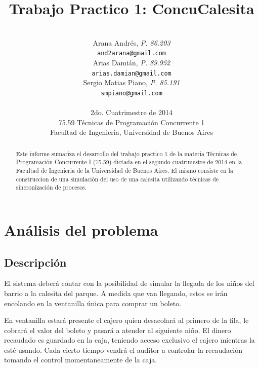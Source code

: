 \documentclass[a4paper,10pt]{article}
\title{\textbf{Trabajo Practico 1: ConcuCalesita}}
\author{\\
  Arana Andrés, \textit{P. 86.203}                                 \\
  \texttt{and2arana@gmail.com}                                     \\ [2.5ex]
  Arias Damián, \textit{P. 89.952}                                 \\
  \texttt{arias.damian@gmail.com}                                  \\ [2.5ex]
  Sergio Matias Piano, \textit{P. 85.191}                          \\
  \texttt{smpiano@gmail.com}                                       \\ [2.5ex]
                                                                   \\
  \normalsize{2do. Cuatrimestre de 2014}                           \\
  \normalsize{75.59 Técnicas de Programación Concurrente 1}        \\
  \normalsize{Facultad de Ingenieria, Universidad de Buenos Aires} \\
}
\date{}
\begin{document}
\thispagestyle{empty}
\maketitle

\begin{abstract}

  Este informe sumariza el desarrollo del trabajo practico 1 de la materia Técnicas de Programación Concurrente I (75.59) dictada en el segundo cuatrimestre de 2014 en la Facultad de Ingenieria de la Universidad de Buenos Aires. El mismo consiste en la construccion de una simulación del uso de una calesita utilizando técnicas de sincronización de procesos.

\end{abstract}

\clearpage

\tableofcontents
\clearpage




\section{Análisis del problema}

\subsection{Descripción}

El sistema deberá contar con la posibilidad de simular la llegada de los niños del barrio a la calesita del parque. A medida que van llegando, estos se irán encolando en la ventanilla única para comprar un boleto.

En ventanilla estará presente el cajero quien desacolará al primero de la fila, le cobrará el valor del boleto y pasará a atender al siguiente niño.
El dinero recaudado es guardado en la caja, teniendo acceso exclusivo el cajero mientras la esté usando.
Cada cierto tiempo vendrá el auditor a controlar la recaudación tomando el control momentaneamente de la caja.
\end{document}
